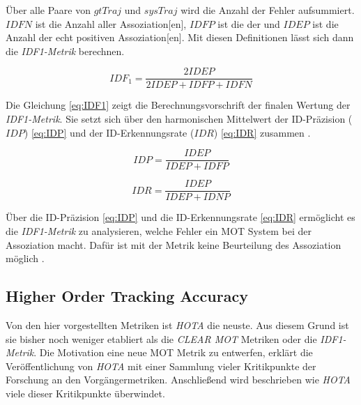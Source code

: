 Über alle Paare von \(gtTraj\) und \(sysTraj\) wird die Anzahl der Fehler aufsummiert. \(IDFN\) ist die Anzahl aller  \gls{Assoziation}[en], \(IDFP\) ist die der  und \(IDEP\) ist die Anzahl der echt positiven \gls{Assoziation}[en]. Mit diesen Definitionen lässt sich dann die \textit{\gls{IDF1}-Metrik} berechnen. 

\begin{equation}
    \label{eq:IDF1}
    IDF_1 = \frac{2 IDEP}{2 IDEP+IDFP+IDFN}
\end{equation}

Die Gleichung \ref{eq:IDF1} zeigt die Berechnungsvorschrift der finalen Wertung der \textit{\gls{IDF1}-Metrik}. Sie setzt sich über den harmonischen Mittelwert der ID-Präzision (\(IDP\)) \ref{eq:IDP} und der ID-Erkennungsrate (\(IDR\)) \ref{eq:IDR} zusammen \cite{IDF1, Kroschel.2011}.

\begin{equation}
    \label{eq:IDP}
    IDP = \frac{IDEP}{IDEP+IDFP}
\end{equation}

\begin{equation}
    \label{eq:IDR}
    IDR = \frac{IDEP}{IDEP+IDNP}
\end{equation}

Über die ID-Präzision \ref{eq:IDP} und die ID-Erkennungsrate \ref{eq:IDR} ermöglicht es die \textit{\gls{IDF1}-Metrik} zu analysieren, welche Fehler ein \gls{MOT} System bei der \gls{Assoziation} macht. Dafür ist mit der Metrik keine Beurteilung des \gls{Assoziation} möglich \cite{IDF1, HOTA}. 

\subsection{Higher Order Tracking Accuracy}
Von den hier vorgestellten Metriken ist \textit{\gls{HOTA}} die neuste. Aus diesem Grund ist sie bisher noch weniger etabliert als die \textit{\acrshort{CLEAR} \gls{MOT}} Metriken oder die \textit{\gls{IDF1}-Metrik}. Die Motivation eine neue \gls{MOT} Metrik zu entwerfen, erklärt die Veröffentlichung von \textit{\gls{HOTA}} \cite{HOTA} mit einer Sammlung vieler Kritikpunkte der Forschung an den Vorgängermetriken. Anschließend wird beschrieben wie \textit{\gls{HOTA}} viele dieser Kritikpunkte überwindet. \par


